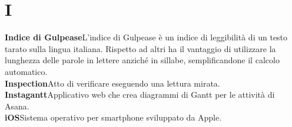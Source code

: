 \newpage
\section{I}\label{l:I}
\textbf{Indice di Gulpease}\newline L'indice di Gulpease è un indice di leggibilità di un testo tarato sulla lingua italiana. Rispetto ad altri ha il vantaggio di utilizzare la lunghezza delle parole in lettere anziché in sillabe, semplificandone il calcolo automatico.\\
\newline
\textbf{Inspection}\newline Atto di verificare eseguendo una lettura mirata.\\
\newline
\textbf{Instagantt}\newline Applicativo web che crea diagrammi di Gantt per le attività di Asana.\\
\newline
\textbf{iOS}\newline Sistema operativo per smartphone sviluppato da Apple.